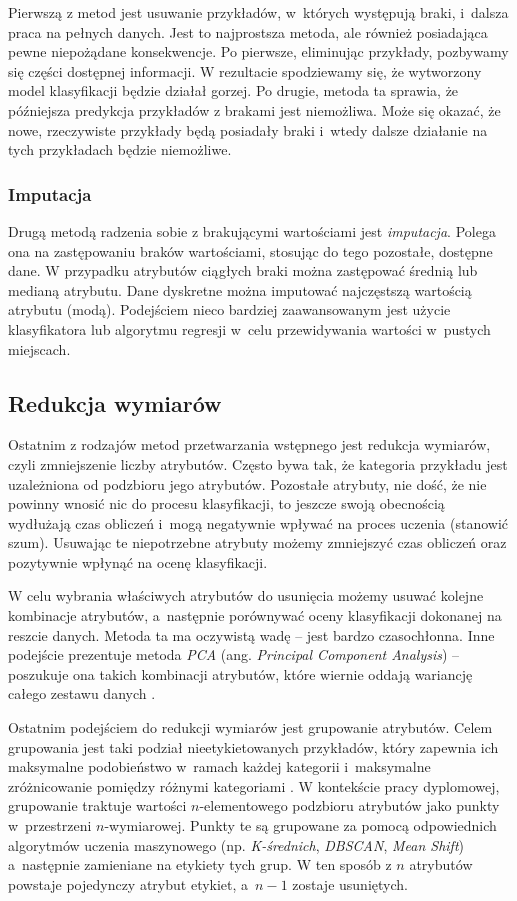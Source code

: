 \documentclass[../thesis.tex]{subfiles}
\begin{document}
Pierwszą z metod jest usuwanie przykładów, w~których występują braki, i~dalsza praca na pełnych danych. Jest to najprostsza metoda, ale również posiadająca pewne niepożądane konsekwencje. Po pierwsze, eliminując przykłady, pozbywamy się części dostępnej informacji. W rezultacie spodziewamy się, że wytworzony model klasyfikacji będzie działał gorzej. Po drugie, metoda ta sprawia, że późniejsza predykcja przykładów z brakami jest niemożliwa. Może się okazać, że nowe, rzeczywiste przykłady będą posiadały braki i~wtedy dalsze działanie na tych przykładach będzie niemożliwe.

\subsubsection{Imputacja}

Drugą metodą radzenia sobie z brakującymi wartościami jest \emph{imputacja}. Polega ona na zastępowaniu braków wartościami, stosując do tego pozostałe, dostępne dane. W przypadku atrybutów ciągłych braki można zastępować średnią lub medianą atrybutu. Dane dyskretne można imputować najczęstszą wartością atrybutu (modą). Podejściem nieco bardziej zaawansowanym jest użycie klasyfikatora lub algorytmu regresji w~celu przewidywania wartości w~pustych miejscach.

\subsection{Redukcja wymiarów}

Ostatnim z rodzajów metod przetwarzania wstępnego jest redukcja wymiarów, czyli zmniejszenie liczby atrybutów. Często bywa tak, że kategoria przykładu jest uzależniona od podzbioru jego atrybutów. Pozostałe atrybuty, nie dość, że nie powinny wnosić nic do procesu klasyfikacji, to jeszcze swoją obecnością wydłużają czas obliczeń i~mogą negatywnie wpływać na proces uczenia (stanowić szum). Usuwając te niepotrzebne atrybuty możemy zmniejszyć czas obliczeń oraz pozytywnie wpłynąć na ocenę klasyfikacji. 

W celu wybrania właściwych atrybutów do usunięcia możemy usuwać kolejne kombinacje atrybutów, a~następnie porównywać oceny klasyfikacji dokonanej na reszcie danych. Metoda ta ma oczywistą wadę – jest bardzo czasochłonna. Inne podejście prezentuje metoda \emph{PCA} (ang. \emph{Principal Component Analysis}) – poszukuje ona takich kombinacji atrybutów, które wiernie oddają wariancję całego zestawu danych \cite{def_pca}. 

Ostatnim podejściem do redukcji wymiarów jest grupowanie atrybutów. Celem grupowania jest taki podział nieetykietowanych przykładów, który zapewnia ich maksymalne podobieństwo w~ramach każdej kategorii i~maksymalne zróżnicowanie pomiędzy różnymi kategoriami \cite{pcichosz}. W kontekście pracy dyplomowej, grupowanie traktuje wartości $n$-elementowego podzbioru atrybutów jako punkty w~przestrzeni $n$-wymiarowej. Punkty te są grupowane za pomocą odpowiednich algorytmów uczenia maszynowego (np. \emph{K-średnich}, \emph{DBSCAN}, \emph{Mean Shift}) a~następnie zamieniane na etykiety tych grup. W ten sposób z $n$ atrybutów powstaje pojedynczy atrybut etykiet, a~$n-1$ zostaje usuniętych.
\end{document}
